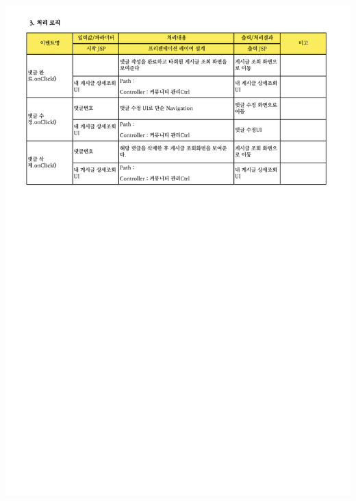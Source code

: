 {{{{{{{{{{{{{{{{{{{{{{{{{{{{{{{{{{{{{{{{{{{{{{{{{{{\includegraphics[width=20cm]{./Figure/Analysis/Display/community/community_10.pdf} \\
}}}}}}}}}}}}}}}}}}}}}}}}}}}}}}}}}}}}}}}}}}}}}}}}}}}
